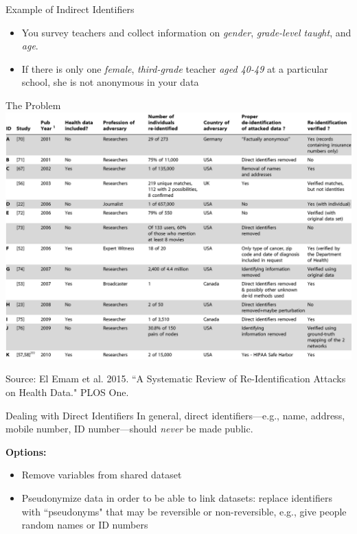 \documentclass[12pt, compress, handout]{beamer}
\let\noteitem\item %
\renewcommand{\item}{ 
	\noteitem\vspace{\fill}
	}
\begin{document}
	\begin{frame}{Example of Indirect Identifiers}	
		\begin{itemize}
			\item You survey teachers and collect information on \textit{gender}, \textit{grade-level taught}, and \textit{age}.
			\item If there is only one \textit{female}, \textit{third-grade} teacher \textit{aged 40-49} at a particular school, she is not anonymous in your data
		\end{itemize}
	\end{frame}		

	\begin{frame}{The Problem}
		 \centering \includegraphics[width=.85\textwidth]{reidentification.png}
		 
		 \tiny{Source: El Emam et al. 2015. ``A Systematic Review of Re-Identification Attacks on Health Data." PLOS One. }
	\end{frame}
	
	\begin{frame}{Dealing with Direct Identifiers}
		In general, direct identifiers---e.g., name, address, mobile number, ID number---should \textit{never} be made public. 
		
		\bigskip
		\pause	
		\textbf{Options:}
		\begin{itemize}
			\item Remove variables from shared dataset
			\item Pseudonymize data in order to be able to link datasets: replace identifiers with ``pseudonyms" that may be reversible or non-reversible, e.g., give people random names or ID numbers
		\end{itemize}
	\end{frame}	
	
\end{document}
